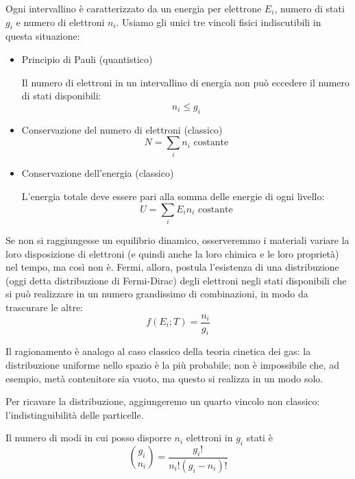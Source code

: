 Ogni intervallino è caratterizzato da un energia per elettrone $E_i$, numero di stati $g_i$ e numero di elettroni $n_i$.
Usiamo gli unici tre vincoli fisici indiscutibili in questa situazione:
\begin{itemize}
    \item Principio di Pauli (quantistico)

    Il numero di elettroni in un intervallino di energia non può eccedere il numero di stati disponibili:
    \begin{equation}
        n_i \leq g_i
    \end{equation}
    \item Conservazione del numero di elettroni (classico)
    \begin{equation}
        N = \sum_i n_i \text{ costante}
    \end{equation}
    \item Conservazione dell'energia (classico)

    L'energia totale deve essere pari alla somma delle energie di ogni livello:
    \begin{equation}
        U = \sum_i E_i n_i \text{ costante}
    \end{equation}
\end{itemize}

Se non si raggiungesse un equilibrio dinamico, osserveremmo i materiali variare la loro disposizione di elettroni (e quindi anche la loro chimica e le loro proprietà) nel tempo, ma così non è.
Fermi, allora, postula l'esistenza di una distribuzione (oggi detta distribuzione di Fermi-Dirac) degli elettroni negli stati disponibili che si può realizzare in un numero grandissimo di combinazioni, in modo da trascurare le altre:
\begin{equation}
    f(E_i; T) = \frac{n_i}{g_i}
\end{equation}

Il ragionamento è analogo al caso classico della teoria cinetica dei gas: la distribuzione uniforme nello spazio è la più probabile;
non è impossibile che, ad esempio, metà contenitore sia vuoto, ma questo si realizza in un modo solo.

Per ricavare la distribuzione, aggiungeremo un quarto vincolo non classico: l'indistinguibilità delle particelle.

Il numero di modi in cui posso disporre $n_i$ elettroni  in $g_i$ stati è
\begin{equation}
    \binom{g_i}{n_i} = \frac{g_i!}{n_i! (g_i - n_i)!}
\end{equation}

